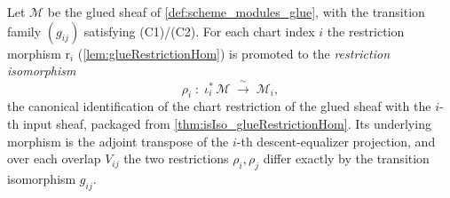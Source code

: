 \begin{definition}\leanok
  \label{def:glueRestrictionIso}
  Let \(\mathcal{M}\) be the glued sheaf of \cref{def:scheme_modules_glue}, with the
  transition family \((g_{ij})\) satisfying (C1)/(C2). For each chart index \(i\) the
  restriction morphism \(\mathrm{r}_i\) (\cref{lem:glueRestrictionHom}) is promoted to
  the \emph{restriction isomorphism}
  \[
    \rho_i \;:\; \iota_i^{*}\,\mathcal{M} \;\xrightarrow{\ \sim\ }\; \mathcal{M}_i,
  \]
  the canonical identification of the chart restriction of the glued sheaf with the
  \(i\)-th input sheaf, packaged from \cref{thm:isIso_glueRestrictionHom}. Its
  underlying morphism is the adjoint transpose of the \(i\)-th descent-equalizer
  projection, and over each overlap \(V_{ij}\) the two restrictions \(\rho_i, \rho_j\)
  differ exactly by the transition isomorphism \(g_{ij}\).
\end{definition}
